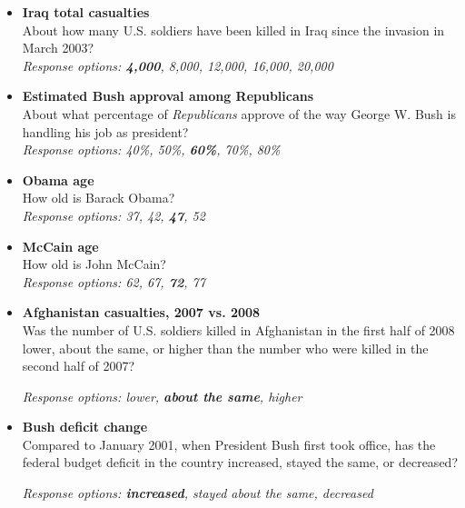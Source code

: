 \documentclass[12pt, letterpaper]{article}
\begin{document}
\begin{itemize}
\item \textbf{Iraq total casualties} \\
  About how many U.S. soldiers have been killed in Iraq since the invasion in March 2003?
\\ \textit{Response options: \textbf{4,000}, 8,000, 12,000, 16,000, 20,000}
   \end{itemize}

\begin{itemize}
\item \textbf{Estimated Bush approval among Republicans} \\
  About what percentage of \textit{Republicans} approve of the way George W. Bush is handling his job as president?
\\ \textit{Response options: 40\%, 50\%, \textbf{60\%}, 70\%, 80\%}
   \end{itemize}
   
   \begin{itemize}
\item \textbf{Obama age} \\
  How old is Barack Obama?
\\ \textit{Response options: 37, 42, \textbf{47}, 52}
   \end{itemize}

   \begin{itemize}
\item \textbf{McCain age} \\
  How old is John McCain?
\\ \textit{Response options: 62, 67, \textbf{72}, 77}
   \end{itemize}


\begin{itemize}
\item \textbf{Afghanistan casualties, 2007 vs. 2008} \\
  Was the number of U.S. soldiers killed in Afghanistan in the first half of 2008 lower, about the same, or higher than the number who were killed in the second half of 2007?

 \textit{Response options: lower, \textbf{about the same}, higher}
   \end{itemize}

\begin{itemize}
\item \textbf{Bush deficit change} \\
Compared to January 2001, when President Bush first took office, has the federal budget deficit in the country increased, stayed the same, or decreased?

\textit{Response options: \textbf{increased}, stayed about the same, decreased}
   \end{itemize}
\end{document}
